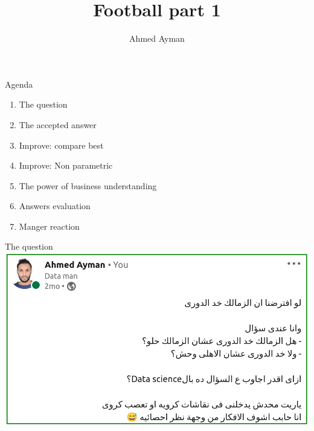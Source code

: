 \documentclass[8pt]{beamer}
\title{Football part 1}
\author{Ahmed Ayman}
\begin{document}
        \maketitle
        
        \begin{frame}[t]{Agenda}
            \begin{enumerate}
                \item The question
                \item The accepted answer
                \item Improve: compare best
                \item Improve: Non parametric
                \item The power of business understanding
                \item Answers evaluation
                \item Manger reaction
            \end{enumerate}
        \end{frame}

        \begin{frame}[t]{The question}
            \centering
            \includegraphics[width =.9\textwidth]{pics/question.png}
        \end{frame}
\end{document}
